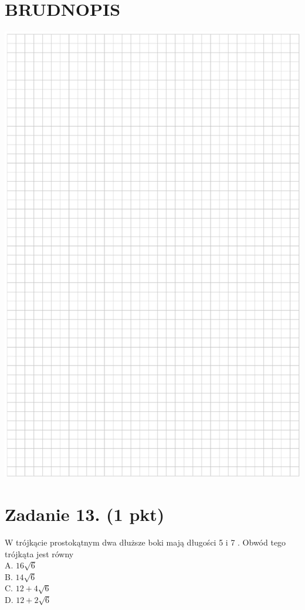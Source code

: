 \documentclass[10pt]{article}
\begin{document}
\section*{BRUDNOPIS}
\begin{center}
\includegraphics[max width=\textwidth]{2024_11_21_dcf819de2d2eef051a0dg-05}
\end{center}

\section*{Zadanie 13. (1 pkt)}
W trójkącie prostokątnym dwa dłuższe boki mają długości 5 i 7 . Obwód tego trójkąta jest równy\\
A. \(16 \sqrt{6}\)\\
B. \(14 \sqrt{6}\)\\
C. \(12+4 \sqrt{6}\)\\
D. \(12+2 \sqrt{6}\)
\end{document}
